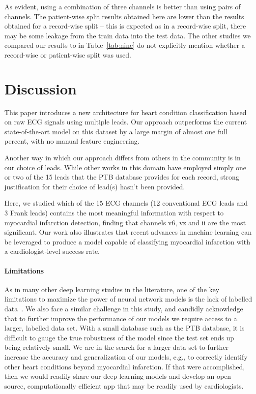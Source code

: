 \documentclass{svproc}
\begin{document}
As evident, using a combination of three channels is better than using pairs of channels. The patient-wise split results obtained here are lower than the results obtained for a record-wise split -- this is expected as in a record-wise split, there may be some leakage from the train data into the test data. The other studies we compared our results to in Table~\ref{tab:nine} do not explicitly mention whether a record-wise or patient-wise split was used. 

\section{Discussion} 

This paper introduces a new architecture for heart condition classification based on raw ECG signals using multiple leads. Our approach outperforms the current state-of-the-art model on this dataset by a large margin of almost one full percent, with no manual feature engineering.

Another way in which our approach differs from others in the community is in our choice of leads. While other works in this domain have employed simply one or two of the 15 leads that the PTB database provides for each record, strong justification for their choice of lead(s) hasn't been provided.

Here, we studied which of the 15 ECG channels (12 conventional ECG leads and 3 Frank leads) contains the most meaningful information with respect to myocardial infarction detection, finding that channels v6, vz and ii are the most significant. Our work also illustrates that recent advances in machine learning can be leveraged to produce a model capable of classifying myocardial infarction with a cardiologist-level success rate. 


\paragraph{Limitations}

As in many other deep learning studies in the literature, one of the key limitations to maximize the power of neural network models is the lack of labelled data~\cite{weistarclusters}. We also face a similar challenge in this study, and candidly acknowledge that to further improve the performance of our models we require access to a larger, labelled data set. With a small database such as the PTB database, it is difficult to gauge the true robustness of the model since the test set ends up being relatively small. We are in the search for a larger data set to further increase the accuracy and generalization of our models, e.g., to correctly identify other heart conditions beyond myocardial infarction. If that were accomplished, then we would readily share our deep learning models and develop an open source, computationally efficient app that may be readily used by cardiologists.
\end{document}
